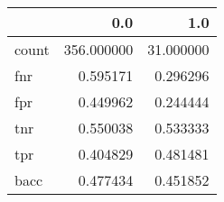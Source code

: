 \begin{tabular}{lrr}
\toprule
{} &         0.0 &        1.0 \\
\midrule
count &  356.000000 &  31.000000 \\
fnr   &    0.595171 &   0.296296 \\
fpr   &    0.449962 &   0.244444 \\
tnr   &    0.550038 &   0.533333 \\
tpr   &    0.404829 &   0.481481 \\
bacc  &    0.477434 &   0.451852 \\
\bottomrule
\end{tabular}
